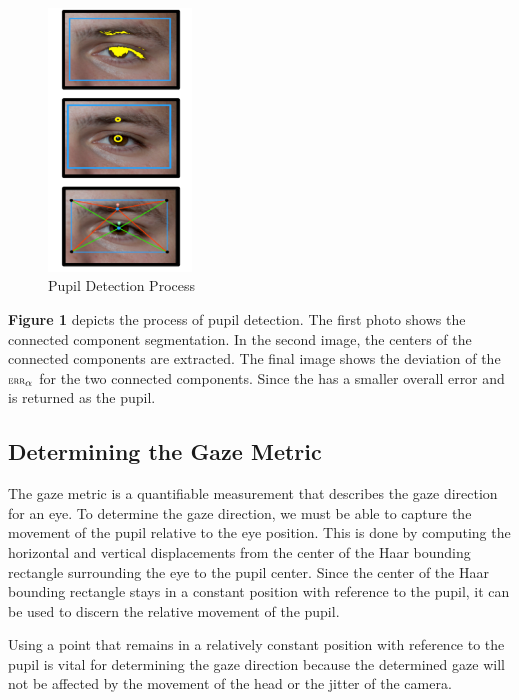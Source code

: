 \documentclass[annual]{acmsiggraph}
\newcommand{\Function}[1]{\ensuremath{{\small \textsc{#1}}}}
\begin{document}
\begin{figure}[ht]

    \centering

    \includegraphics[width=1.5in]{figs/pupilDetection.pdf}

    \caption{Pupil Detection Process}

\end{figure}

\textbf{Figure 1} depicts the process of pupil detection. The first photo shows
the connected component segmentation. In the second image, the centers of the
connected components are extracted. The final image shows the deviation of the
$\Function{err}_{\alpha}$ for the two connected components.  Since the has a
smaller overall error and is returned as the pupil.

\subsection{Determining the Gaze Metric}

The gaze metric is a quantifiable measurement that describes the gaze direction
for an eye. To determine the gaze direction, we must be able to capture the
movement of the pupil relative to the eye position. This is done by computing
the horizontal and vertical displacements from the center of the Haar bounding
rectangle surrounding the eye to the pupil center. Since the center of the Haar
bounding rectangle stays in a constant position with reference to the pupil, it
can be used to discern the relative movement of the pupil.

Using a point that remains in a relatively constant position with reference to
the pupil is vital for determining the gaze direction because the determined
gaze will not be affected by the movement of the head or the jitter of the
camera.
\end{document}
